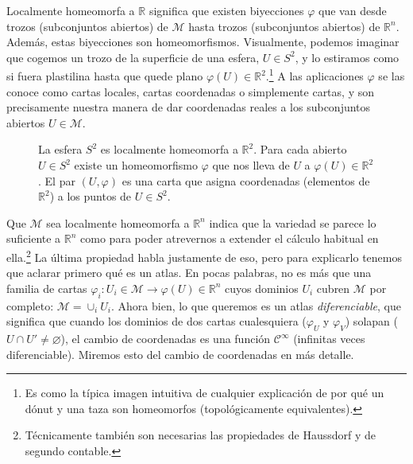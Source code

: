 Localmente homeomorfa a \(\mathbb{R}\) significa que existen biyecciones \(\varphi\) que van desde trozos (subconjuntos abiertos) de \(\mathcal{M}\) hasta trozos (subconjuntos abiertos) de \(\mathbb{R}^n\). Además, estas biyecciones son homeomorfismos. Visualmente, podemos imaginar que cogemos un trozo de la superficie de una esfera, \(U\in S^2\), y lo estiramos como si fuera plastilina hasta que quede plano \(\varphi(U)\in\mathbb{R}^2\).\footnote{Es como la típica imagen intuitiva de cualquier explicación de por qué un dónut y una taza son homeomorfos (topológicamente equivalentes).} A las aplicaciones \(\varphi\) se las conoce como cartas locales, cartas coordenadas o simplemente cartas, y son precisamente nuestra manera de dar coordenadas reales a los subconjuntos abiertos \(U\in\mathcal{M}\).

\begin{figure}[htbp]
    \centering
    
    \caption{La esfera \(S^2\) es localmente homeomorfa a \(\mathbb{R}^2\). Para cada abierto \(U\in S^2\) existe un homeomorfismo \(\varphi\) que nos lleva de \(U\) a \(\varphi(U)\in\mathbb{R}^2\). El par \((U,\varphi)\) es una carta que asigna coordenadas (elementos de \(\mathbb{R}^2\)) a los puntos de \(U\in S^2\).}
    \label{fig.3-carta_localmentehomeomorfo}
\end{figure}

Que \(\mathcal{M}\) sea localmente homeomorfa a \(\mathbb{R}^n\) indica que la variedad se parece lo suficiente a \(\mathbb{R}^n\) como para poder atrevernos a extender el cálculo habitual en ella.\footnote{Técnicamente también son necesarias las propiedades de Haussdorf y de segundo contable.} La última propiedad habla justamente de eso, pero para explicarlo tenemos que aclarar primero qué es un atlas. En pocas palabras, no es más que una familia de cartas \(\varphi_i:U_i\in\mathcal{M}\rightarrow \varphi(U)\in\mathbb{R}^n\) cuyos dominios \(U_i\) cubren \(\mathcal{M}\) por completo: \(\mathcal{M} = \cup_{i}U_i\). Ahora bien, lo que queremos es un atlas \emph{diferenciable}, que significa que cuando los dominios de dos cartas cualesquiera (\(\varphi_U\) y \(\varphi_V\)) solapan (\(U\cap U'\neq \varnothing\)), el cambio de coordenadas es una función \(\mathcal{C}^\infty\) (infinitas veces diferenciable). Miremos esto del cambio de coordenadas en más detalle.

